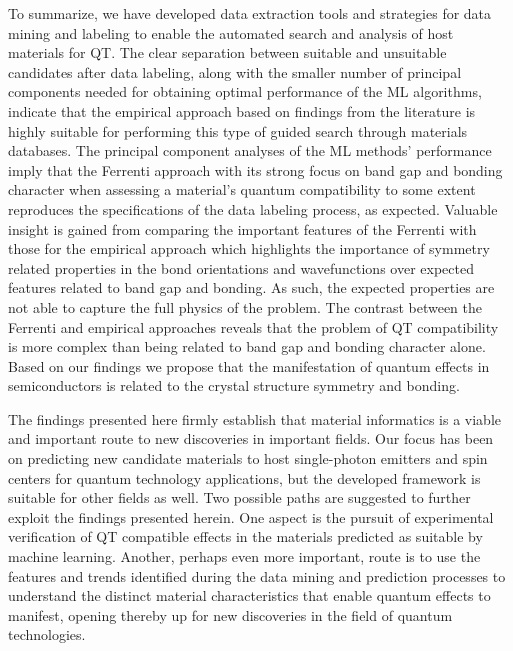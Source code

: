 \documentclass[superscriptaddress,
preprint,
 amsmath,amssymb,
 aps,
]{revtex4-2}
\newcommand{\mrk}[1]{\textcolor{red}{#1}}
\begin{document}
To summarize, we have developed data extraction tools and strategies for data mining and labeling to enable the automated search and analysis of host materials for QT. 
The clear separation between suitable and unsuitable candidates after data labeling, along with the smaller number of principal components needed for obtaining optimal performance of the ML algorithms, indicate that the empirical approach based on findings from the literature is highly suitable for performing this type of guided search through materials databases. 
The principal component analyses of the ML methods' performance imply that the Ferrenti approach with its strong focus on band gap and bonding character when assessing a material's quantum compatibility to some extent reproduces the specifications of the data labeling process, as expected. 
Valuable insight is gained from comparing the important features of the Ferrenti with those for the empirical approach which highlights the importance of symmetry related properties in the bond orientations and wavefunctions over expected features related to band gap and bonding. As such, the expected properties are not able to capture the full physics of the problem. The contrast between the Ferrenti and empirical approaches reveals that the problem of QT compatibility is more complex than being related to band gap and bonding character alone. Based on our findings we propose that the manifestation of quantum effects in semiconductors is related to the crystal structure symmetry and bonding.


The findings presented here firmly establish that material informatics is a viable and important route to new discoveries in important fields. 
Our focus has been on predicting new candidate materials to host single-photon emitters and spin centers for quantum technology applications, but the developed framework is suitable for other fields as well. Two possible paths are suggested to further exploit the findings presented herein. One aspect is the pursuit of experimental verification of QT compatible effects in the materials predicted as suitable by machine learning. Another, perhaps even more important, route is to use the features and trends identified during the data mining and prediction processes to understand the distinct material characteristics that enable quantum effects to manifest, opening  thereby up for new discoveries in the field of quantum technologies. 
\end{document}
